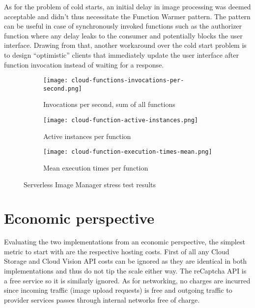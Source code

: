 As for the problem of cold starts, an initial delay in image processing was deemed acceptable and didn't thus necessitate the Function Warmer pattern. The pattern can be useful in case of synchronously invoked functions such as the authorizer function where any delay leaks to the consumer and potentially blocks the user interface. Drawing from that, another workaround over the cold start problem is to design ``optimistic'' clients that immediately update the user interface after function invocation instead of waiting for a response.



\begin{figure}
  \centering
  \begin{subfigure}[b]{0.9\textwidth}
      \texttt{[image: cloud-functions-invocations-per-second.png]}
      \caption{Invocations per second, sum of all functions}
      \label{fig:tiger}
  \end{subfigure}

  \begin{subfigure}[b]{0.9\textwidth}
      \texttt{[image: cloud-function-active-instances.png]}
      \caption{Active instances per function}
      \label{fig:gull}
  \end{subfigure}

  \begin{subfigure}[b]{0.9\textwidth}
      \texttt{[image: cloud-function-execution-times-mean.png]}
      \caption{Mean execution times per function}
      \label{fig:mouse}
  \end{subfigure}
  \caption{Serverless Image Manager stress test results}\label{fig:serverlessStressTest}
\end{figure}

\section{Economic perspective}

Evaluating the two implementations from an economic perspective, the simplest metric to start with are the respective hosting costs. First of all any Cloud Storage and Cloud Vision API costs can be ignored as they are identical in both implementations and thus do not tip the scale either way. The reCaptcha API is a free service so it is similarly ignored. As for networking, no charges are incurred since incoming traffic (image upload requests) is free and outgoing traffic to provider services passes through internal networks free of charge.

